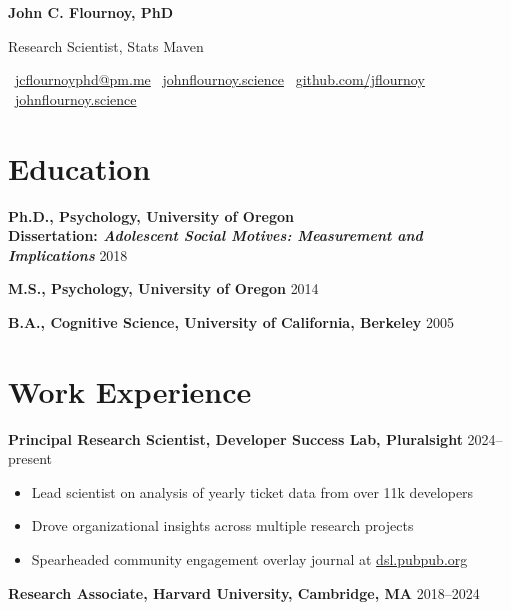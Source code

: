 \documentclass[
  10pt,
  letterpaper,
  DIV=11,
  numbers=noendperiod]{scrartcl}
\author{}
\date{}
\providecommand{\tightlist}{%
  \setlength{\itemsep}{0pt}\setlength{\parskip}{0pt}}\usepackage{longtable,booktabs,array}
\newcommand{\entry}[2]{%
  \noindent \textbf{#1} \hfill {\small #2}
}
\begin{document}
\begin{center}
{\LARGE\sffamily\textbf{John C. Flournoy, PhD}\par}
\vspace{0.2em}
{\large\sffamily Research Scientist, Stats Maven\par}
\vspace{0.3em}

\sffamily\small
\faEnvelope\ \href{mailto:jcflournoyphd@pm.me}{jcflournoyphd@pm.me} \quad
\faGlobe\ \href{https://johnflournoy.science}{johnflournoy.science} \quad
\faGithub\ \href{https://github.com/jflournoy}{github.com/jflournoy} \quad
\faAt\ \href{https://bsky.app/profile/johnflournoy.science}{johnflournoy.science}
\end{center}
\vspace{0.5em}


\section{Education}\label{education}

\entry{Ph.D., Psychology, University of Oregon \\ \textmd{Dissertation: \textit{Adolescent Social Motives: Measurement and Implications}}}{2018}

\entry{M.S., Psychology, University of Oregon}{2014}

\entry{B.A., Cognitive Science, University of California, Berkeley}{2005}

\section{Work Experience}\label{work-experience}

\entry{Principal Research Scientist, Developer Success Lab, Pluralsight}{2024--present}

\begin{itemize}
\tightlist
\item
  Lead scientist on analysis of yearly ticket data from over 11k
  developers
\item
  Drove organizational insights across multiple research projects
\item
  Spearheaded community engagement overlay journal at
  \href{http://dsl.pubpub.org}{dsl.pubpub.org}
\end{itemize}

\entry{Research Associate, Harvard University, Cambridge, MA}{2018–2024}
\end{document}
